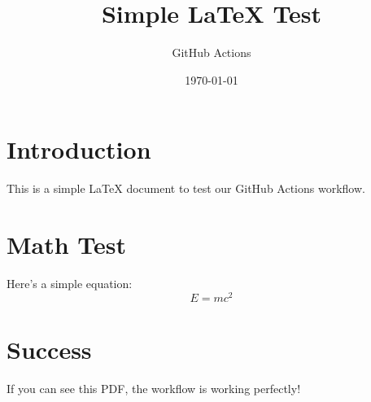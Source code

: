 \documentclass[12pt,a4paper]{article}
\title{Simple LaTeX Test}
\author{GitHub Actions}
\date{\today}
\begin{document}
\maketitle

\section{Introduction}
This is a simple LaTeX document to test our GitHub Actions workflow.

\section{Math Test}
Here's a simple equation:
\begin{equation}
    E = mc^2
\end{equation}

\section{Success}
If you can see this PDF, the workflow is working perfectly!
\end{document}
